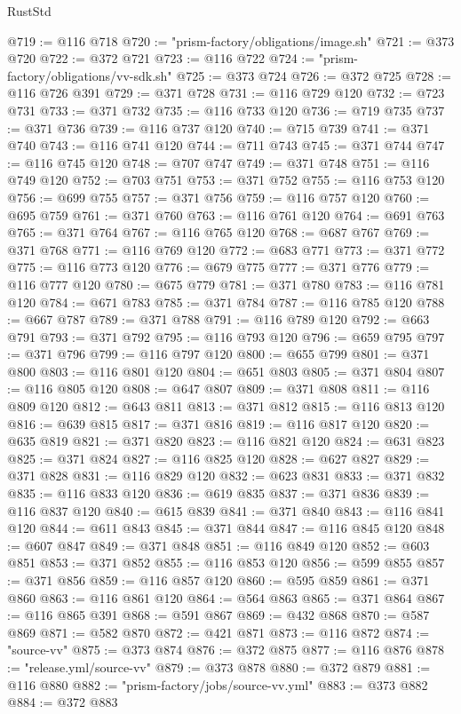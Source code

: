 \begin{lexlean}{RustStd}
\begin{coremodule}
@719 := @116 @718
@720 := "prism-factory/obligations/image.sh"
@721 := @373 @720
@722 := @372 @721
@723 := @116 @722
@724 := "prism-factory/obligations/vv-sdk.sh"
@725 := @373 @724
@726 := @372 @725
@728 := @116 @726 @391
@729 := @371 @728
@731 := @116 @729 @120
@732 := @723 @731
@733 := @371 @732
@735 := @116 @733 @120
@736 := @719 @735
@737 := @371 @736
@739 := @116 @737 @120
@740 := @715 @739
@741 := @371 @740
@743 := @116 @741 @120
@744 := @711 @743
@745 := @371 @744
@747 := @116 @745 @120
@748 := @707 @747
@749 := @371 @748
@751 := @116 @749 @120
@752 := @703 @751
@753 := @371 @752
@755 := @116 @753 @120
@756 := @699 @755
@757 := @371 @756
@759 := @116 @757 @120
@760 := @695 @759
@761 := @371 @760
@763 := @116 @761 @120
@764 := @691 @763
@765 := @371 @764
@767 := @116 @765 @120
@768 := @687 @767
@769 := @371 @768
@771 := @116 @769 @120
@772 := @683 @771
@773 := @371 @772
@775 := @116 @773 @120
@776 := @679 @775
@777 := @371 @776
@779 := @116 @777 @120
@780 := @675 @779
@781 := @371 @780
@783 := @116 @781 @120
@784 := @671 @783
@785 := @371 @784
@787 := @116 @785 @120
@788 := @667 @787
@789 := @371 @788
@791 := @116 @789 @120
@792 := @663 @791
@793 := @371 @792
@795 := @116 @793 @120
@796 := @659 @795
@797 := @371 @796
@799 := @116 @797 @120
@800 := @655 @799
@801 := @371 @800
@803 := @116 @801 @120
@804 := @651 @803
@805 := @371 @804
@807 := @116 @805 @120
@808 := @647 @807
@809 := @371 @808
@811 := @116 @809 @120
@812 := @643 @811
@813 := @371 @812
@815 := @116 @813 @120
@816 := @639 @815
@817 := @371 @816
@819 := @116 @817 @120
@820 := @635 @819
@821 := @371 @820
@823 := @116 @821 @120
@824 := @631 @823
@825 := @371 @824
@827 := @116 @825 @120
@828 := @627 @827
@829 := @371 @828
@831 := @116 @829 @120
@832 := @623 @831
@833 := @371 @832
@835 := @116 @833 @120
@836 := @619 @835
@837 := @371 @836
@839 := @116 @837 @120
@840 := @615 @839
@841 := @371 @840
@843 := @116 @841 @120
@844 := @611 @843
@845 := @371 @844
@847 := @116 @845 @120
@848 := @607 @847
@849 := @371 @848
@851 := @116 @849 @120
@852 := @603 @851
@853 := @371 @852
@855 := @116 @853 @120
@856 := @599 @855
@857 := @371 @856
@859 := @116 @857 @120
@860 := @595 @859
@861 := @371 @860
@863 := @116 @861 @120
@864 := @564 @863
@865 := @371 @864
@867 := @116 @865 @391
@868 := @591 @867
@869 := @432 @868
@870 := @587 @869
@871 := @582 @870
@872 := @421 @871
@873 := @116 @872
@874 := "source-vv"
@875 := @373 @874
@876 := @372 @875
@877 := @116 @876
@878 := "release.yml/source-vv"
@879 := @373 @878
@880 := @372 @879
@881 := @116 @880
@882 := "prism-factory/jobs/source-vv.yml"
@883 := @373 @882
@884 := @372 @883

\end{coremodule}
\end{lexlean}
